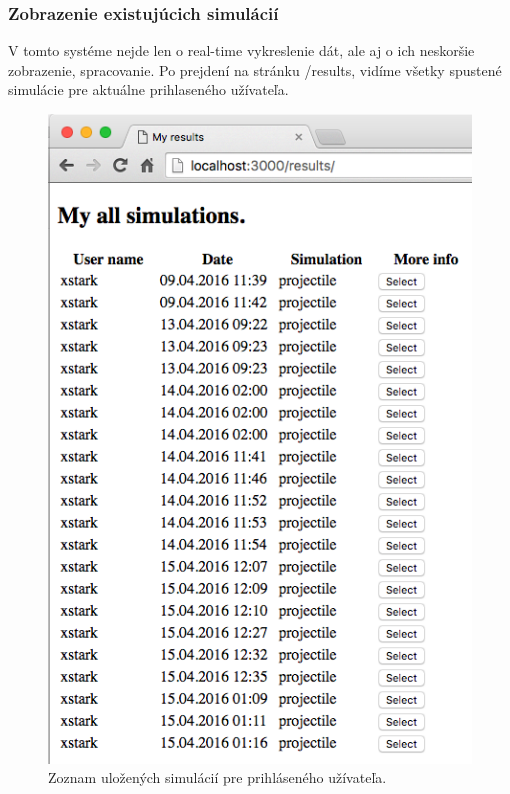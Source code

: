 \subsubsection{Zobrazenie existujúcich simulácií}
V tomto systéme nejde len o real-time vykreslenie dát, ale aj o ich neskoršie zobrazenie, spracovanie. Po prejdení na stránku /results, vidíme všetky spustené simulácie pre aktuálne prihlaseného užívateľa.

\begin{figure}[H]
  \centering
  \includegraphics[scale=0.5]{img/code/angular-results-projectile.png}
  \caption{Zoznam uložených simulácií pre prihláseného užívateľa.}
  \label{img-angular-results-projectile}
\end{figure}

